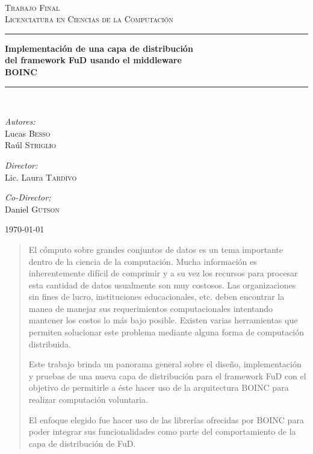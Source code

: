 \documentclass[12pt,spanish,a4paper]{report}
\newcommand{\HRule}{\rule{\linewidth}{0.5mm}}
\begin{document}
\begin{titlepage}
\begin{center}
			\textsc{\\[2cm] \large Trabajo Final}\\[0.2cm]
			\textsc{Licenciatura en Ciencias de la Computación}\\[0.2cm]

			\HRule
			{ \Large \bfseries Implementación de una capa de distribución \\del framework FuD usando el middleware \\BOINC\\}
			\HRule 
			\\[4cm]
			

			\begin{multicols}{3}
				\begin{center} \large
					\emph{Autores:}\\
					Lucas \textsc{Besso}\\
					Raúl \textsc{Striglio}
				\end{center}
				\columnbreak  
			
				\begin{center} \large
					\emph{Director:} \\
					Lic. Laura \textsc{Tardivo}
				\end{center}
				\columnbreak  
			
				\begin{center} \large
				\emph{Co-Director:} \\
				Daniel \textsc{Gutson}
				\end{center}
			\end{multicols}
			
			\vfill
			\today

		\end{center}
	\end{titlepage}

	\newpage

	\begin{abstract}
El cómputo sobre grandes conjuntos de datos es un tema importante dentro de la ciencia de la computación. Mucha información es inherentemente difícil de comprimir y a su vez los recursos para procesar esta cantidad de datos usualmente son muy costosos. Las organizaciones sin fines de lucro, instituciones educacionales, etc. deben encontrar la manea de manejar sus requerimientos computacionales intentando mantener los costos lo más bajo posible. Existen varias herramientas que permiten solucionar este problema mediante alguna forma de computación distribuida.

Este trabajo brinda un panorama general sobre el diseño, implementación y pruebas de una nueva capa de distribución para el framework FuD con el objetivo de permitirle a éste hacer uso de la arquitectura BOINC para realizar computación voluntaria.

El enfoque elegido fue hacer uso de las librerías ofrecidas por BOINC para poder integrar sus funcionalidades como parte del comportamiento de la capa de distribución de FuD.
	\end{abstract}
\end{document}
